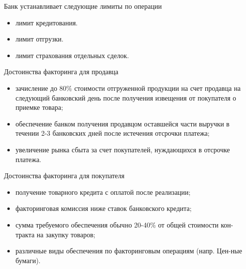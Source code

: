 \documentclass[_Banking_p3.tex]{subfiles}
\begin{document}
\begin{frame} {Банк устанавливает следующие лимиты по операции}
\begin{itemize}[<+->]
\item
лимит кредитования. 

\item
лимит отгрузки. 

\item
лимит страхования отдельных сделок. 

\end{itemize}

\end{frame}
\begin{frame}{Достоинства факторинга для продавца}
\begin{itemize}[<+->]
\item
зачисление до 80\% стоимости отгруженной продукции на счет продавца на следующий банковский день после получения извещения от покупателя о приемке товара;

\item
обеспечение банком получения продавцом оставшейся части выручки в течении 2-3 банковских дней после истечения отсрочки платежа;

\item
увеличение рынка сбыта за счет покупателей, нуждающихся в отсрочке платежа.

\end{itemize}

\end{frame}
\begin{frame}{Достоинства факторинга для покупателя}
\begin{itemize}[<+->]
\item
получение товарного кредита с оплатой после реализации;

\item
факторинговая комиссия ниже ставок банковского кредита;

\item
сумма требуемого обеспечения обычно 20-40\% от общей стоимости кон-тракта на закупку товаров;

\item
различные виды обеспечения по факторинговым операциям (напр. Цен-ные бумаги).

\end{itemize}

\end{frame}
\end{document}
